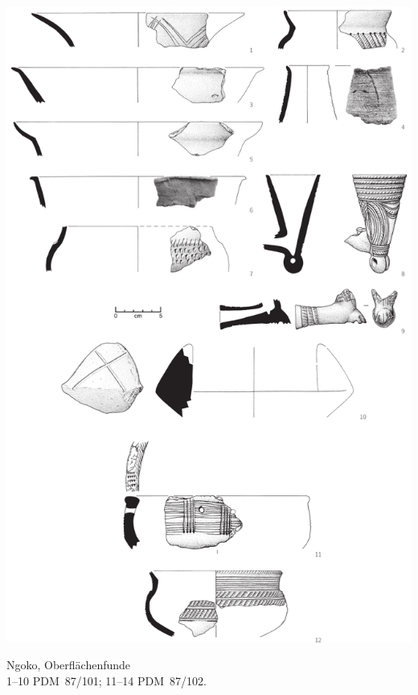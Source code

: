 \begin{pl}[H]
	\includegraphics{plt/Taf65.pdf}
	\vspace{.75em}\caption{\mbox{Ngoko}, Oberflächenfunde \\ 1--10 PDM~87/101; 11--14 PDM~87/102.}
	\label{pl:65}
\end{pl}

